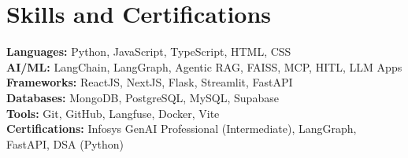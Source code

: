 \documentclass[letterpaper,10pt]{article}
\begin{document}
\section{Skills and Certifications}
\textbf{Languages:} Python, JavaScript, TypeScript, HTML, CSS \\
\textbf{AI/ML:} LangChain, LangGraph, Agentic RAG, FAISS, MCP, HITL, LLM Apps \\
\textbf{Frameworks:} ReactJS, NextJS, Flask, Streamlit, FastAPI \\
\textbf{Databases:} MongoDB, PostgreSQL, MySQL, Supabase \\
\textbf{Tools:} Git, GitHub, Langfuse, Docker, Vite \\
\textbf{Certifications:} Infosys GenAI Professional (Intermediate), LangGraph, FastAPI, DSA (Python)
\end{document}

